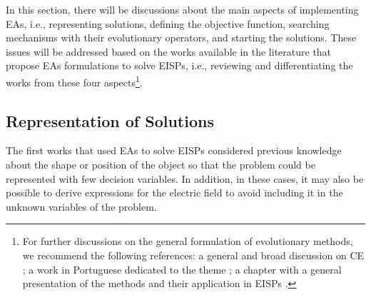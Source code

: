 		In this section, there will be discussions about the main aspects of implementing EAs, i.e., representing solutions, defining the objective function, searching mechanisms with their evolutionary operators, and starting the solutions. These issues will be addressed based on the works available in the literature that propose EAs formulations to solve EISPs, i.e., reviewing and differentiating the works from these four aspects\footnote{For further discussions on the general formulation of evolutionary methods, we recommend the following references: a general and broad discussion on CE \citep{eiben2015introduction}; a work in Portuguese dedicated to the theme \citep{gaspar2012manual}; a chapter with a general presentation of the methods and their application in EISPs \citep{pastorino2010chap7}.}.

		\subsection{Representation of Solutions}\label{chap:methods:stochastic:representation}
		
			The first works that used EAs to solve EISPs considered previous knowledge about the shape or position of the object so that the problem could be represented with few decision variables. In addition, in these cases, it may also be possible to derive expressions for the electric field to avoid including it in the unknown variables of the problem.
			
